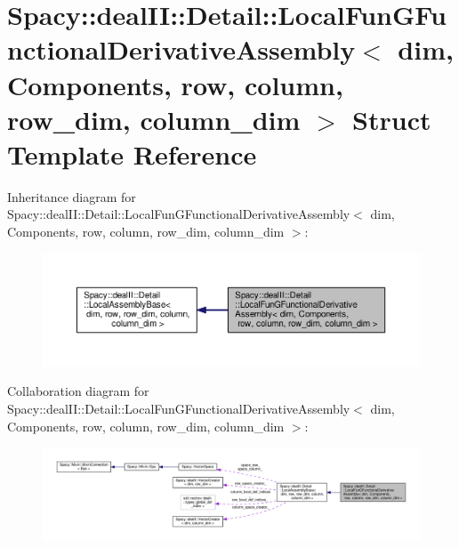 \hypertarget{structSpacy_1_1dealII_1_1Detail_1_1LocalFunGFunctionalDerivativeAssembly}{\section{Spacy\-:\-:deal\-I\-I\-:\-:Detail\-:\-:Local\-Fun\-G\-Functional\-Derivative\-Assembly$<$ dim, Components, row, column, row\-\_\-dim, column\-\_\-dim $>$ Struct Template Reference}
\label{structSpacy_1_1dealII_1_1Detail_1_1LocalFunGFunctionalDerivativeAssembly}
}


Inheritance diagram for Spacy\-:\-:deal\-I\-I\-:\-:Detail\-:\-:Local\-Fun\-G\-Functional\-Derivative\-Assembly$<$ dim, Components, row, column, row\-\_\-dim, column\-\_\-dim $>$\-:
\nopagebreak
\begin{figure}[H]
\begin{center}
\leavevmode
\includegraphics[width=350pt]{structSpacy_1_1dealII_1_1Detail_1_1LocalFunGFunctionalDerivativeAssembly__inherit__graph}
\end{center}
\end{figure}


Collaboration diagram for Spacy\-:\-:deal\-I\-I\-:\-:Detail\-:\-:Local\-Fun\-G\-Functional\-Derivative\-Assembly$<$ dim, Components, row, column, row\-\_\-dim, column\-\_\-dim $>$\-:
\nopagebreak
\begin{figure}[H]
\begin{center}
\leavevmode
\includegraphics[width=350pt]{structSpacy_1_1dealII_1_1Detail_1_1LocalFunGFunctionalDerivativeAssembly__coll__graph}
\end{center}
\end{figure}
